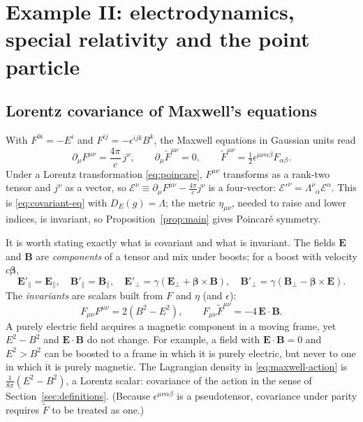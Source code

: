 \section{Example II: electrodynamics, special relativity and the point particle}
\label{sec:sr}

\subsection{Lorentz covariance of Maxwell's equations}

With $F^{0i}=-E^i$ and $F^{ij}=-\epsilon^{ijk}B^k$, the Maxwell equations in
Gaussian units read
\begin{equation}\label{eq:maxwell}
  \partial_\mu F^{\mu\nu}=\frac{4\pi}{c}\,j^\nu,\qquad
  \partial_\mu\tilde F^{\mu\nu}=0,\qquad
  \tilde F^{\mu\nu}=\tfrac12\epsilon^{\mu\nu\alpha\beta}F_{\alpha\beta}.
\end{equation}
Under a Lorentz transformation \eqref{eq:poincare}, $F^{\mu\nu}$ transforms as a
rank-two tensor and $j^\nu$ as a vector, so
$\mathcal E^\nu\equiv\partial_\mu F^{\mu\nu}-\tfrac{4\pi}{c}j^\nu$ is a
four-vector: $\mathcal E'^\nu=\Lambda^\nu{}_\alpha\mathcal E^\alpha$. This is
\eqref{eq:covariant-eq} with $D_E(g)=\Lambda$; the metric $\eta_{\mu\nu}$,
needed to raise and lower indices, is invariant, so Proposition~\ref{prop:main}
gives Poincar\'e symmetry.

It is worth stating exactly what is covariant and what is invariant.
The fields ${\bm{E}}$ and ${\bm{B}}$ are \emph{components} of a tensor and mix under
boosts; for a boost with velocity $c{\bm{\beta}}$,
\begin{equation}\label{eq:boost-fields}
  {\bm{E}}'_\parallel={\bm{E}}_\parallel,\quad {\bm{B}}'_\parallel={\bm{B}}_\parallel,\quad
  {\bm{E}}'_\perp=\gamma({\bm{E}}_\perp+{\bm{\beta}}\times{\bm{B}}),\quad
  {\bm{B}}'_\perp=\gamma({\bm{B}}_\perp-{\bm{\beta}}\times{\bm{E}}).
\end{equation}
The \emph{invariants} are scalars built from $F$ and $\eta$ (and $\epsilon$):
\begin{equation}\label{eq:EM-invariants}
  F_{\mu\nu}F^{\mu\nu}=2(B^2-E^2),\qquad
  F_{\mu\nu}\tilde F^{\mu\nu}=-4\,{\bm{E}}\!\cdot\!{\bm{B}} .
\end{equation}
A purely electric field acquires a magnetic component in a moving frame, yet
$E^2-B^2$ and ${\bm{E}}\!\cdot\!{\bm{B}}$ do not change. For example, a field with
${\bm{E}}\!\cdot\!{\bm{B}}=0$ and $E^2>B^2$ can be boosted to a frame in which it is
purely electric, but never to one in which it is purely magnetic. The
Lagrangian density in \eqref{eq:maxwell-action} is $\tfrac1{8\pi}(E^2-B^2)$, a
Lorentz scalar: covariance of the action in the sense of
Section~\ref{sec:definitions}. (Because $\epsilon^{\mu\nu\alpha\beta}$ is a
pseudotensor, covariance under parity requires $\tilde F$ to be treated as
one.)

